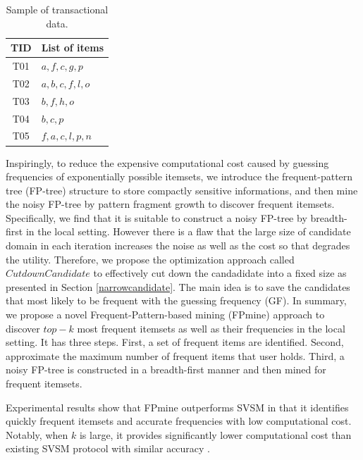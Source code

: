 \documentclass[conference]{IEEEtran}
\begin{document}
\begin{table}[tb]
\caption{{\color{red}Sample of transactional data.}}
\label{trans table}
\centering
\begin{tabular}{|c|l|}\hline
  TID&List of items \\\hline
  T01&$a,f,c,g,p$ \\\hline
  T02&$a,b,c,f,l,o$ \\\hline
  T03&$b,f,h,o$ \\\hline
  T04&$b,c,p$ \\\hline
  T05&$f,a,c,l,p,n$ \\\hline
\end{tabular}
\end{table}

Inspiringly, to reduce the expensive computational cost caused by guessing frequencies of exponentially possible itemsets, we introduce the frequent-pattern tree (FP-tree)\cite{fp} structure to store compactly sensitive informations, and then mine the noisy FP-tree by pattern fragment growth to discover frequent itemsets. Specifically, we find that it is suitable to construct a noisy FP-tree by breadth-first in the local setting. However there is a flaw that the large size of candidate domain in each iteration increases the noise as well as the cost so that degrades the utility. Therefore, we propose the optimization approach called $CutdownCandidate$ to effectively cut down the candadidate into a fixed size as presented in Section \ref{narrowcandidate}. The main idea is to save the candidates that most likely to be frequent with the guessing frequency (GF). In summary, we propose a novel {\color{red}Frequent-Pattern-based mining (FPmine)} approach to discover $top-k$ most frequent itemsets as well as their frequencies in the local setting. {\color{red}It has three steps. First, a set of frequent items are identified. Second, approximate the maximum number of frequent items that user holds. Third, a noisy FP-tree is constructed in a breadth-first manner and then mined for frequent itemsets.}

Experimental results show that {\color{red}FPmine outperforms SVSM in that it identifies quickly frequent itemsets and accurate frequencies with low computational cost. Notably, when $k$ is large, it provides significantly lower computational cost than existing SVSM protocol with similar accuracy .}
\end{document}
